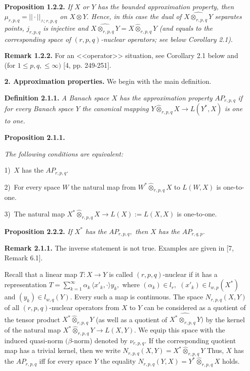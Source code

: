   \textbf{Proposition 1.2.2.}  {\it
 If $X$ or $Y$ has the bounded approximation property, then
 $\mu_{r,p,q}= ||\cdot||_{\land\!; r,p,q}$ on $X\otimes Y.$ Hence, in this case
 the dual of $\widehat{X\otimes_{r,p,q} Y}$ separates points, $j_{r,p,q}$ is injective and
 $\widehat{X\otimes_{r,p,q} Y}= X\widehat\otimes_{r,p,q} Y$ (and equals to the corresponding space of
 $(r,p,q)$-nuclear operators; see below Corollary 2.1).
 }
                              \smallskip


\textbf{Remark 1.2.2.}
For an <<operator>> situation, see Corollary 2.1 below
and (for $1\leqslant p,q,\leqslant \infty)$ [4, pp. 249-251].

          \bigskip


{\bf 2. Approximation properties.}
We begin with the main definition.
\smallskip

\textbf{Definition 2.1.1.} {\it
 A Banach space $X$ has the approximation property $AP_{r,p,q}$ if
 for every Banach space $Y$ the canonical map\-ping $Y\widehat\otimes_{r,p,q} X\to L(Y^*,X)$
 is one to one.
 }
 \smallskip

\textbf{Proposition 2.1.1.} {\it
  The following conditions are equivalent:

  1)\,
$X$ has the $AP_{r,p,q}.$

2)\,
For every space $W$
the natural map from $W^*\widehat\otimes_{r,p,q} X$ to $L(W,X)$ is one-to-one.

3)\,
The natural map $X^*\widehat\otimes_{r,p,q} X\to L(X):=L(X,X)$ is one-to-one.
}
        \smallskip


  \textbf{Proposition 2.2.2.} {\it
 If $X^*$ has the $AP_{r,p,q},$ then $X$ has the $AP_{r,q,p}.$
 }
             \smallskip

       \textbf{Remark 2.1.1.}
        The inverse statement is not true. Exam\-ples
     are given in [7, Remark 6.1].
             \smallskip


Recall that a linear map $T: X\to Y$ is called $(r,p,q)$-nuclear
if it has a representation $T= \sum_{k=1}^\infty \alpha_k\, \langle  x'_k, \cdot\rangle y_k,$
where $(\alpha_k)\in l_r,$ $(x'_k)\in l_{w,p}(X^*)$ and $(y_k)\in l_{w,q}(Y).$
Every such a map is continuous. The space $N_{r,p,q}(X,Y)$ of all
$(r,p,q)$-nuclear operators from $X$ to $Y$ can be considered as a quotient
of the tensor product $X^*\widehat\otimes_{r,p,q} Y$ (as well as a quotient of
$\widehat{X^*\otimes_{r,p,q} Y})$ by the kernel of the natural map
$X^*\widehat\otimes_{r,p,q} Y \to L(X,Y).$ We equip this space with the induced
quasi-norm $(\beta$-norm)
denoted by $\nu_{r,p,q}.$ If the corresponding quotient map has
a trivial kernel, then we write $N_{r,p,q}(X,Y)= X^*\widehat\otimes_{r,p,q} Y$
Thus, $X$ has the $AP_{r,p,q}$ iff for every space $Y$ the equality
 $N_{r,p,q}(Y,X)= Y^*\widehat\otimes_{r,p,q} X$ holds.
        \smallskip


